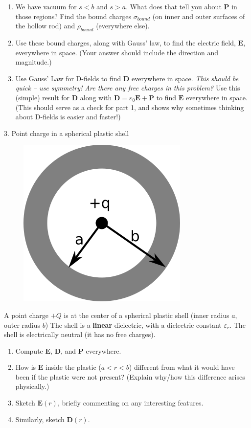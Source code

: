 \documentclass[11pt]{article}
\def\tightlist{}
\begin{document}
\begin{enumerate}
\def\labelenumi{\arabic{enumi}.}
\tightlist
\item
  We have vacuum for \(s<b\) and \(s>a\). What does that tell you about
  \(\mathbf{P}\) in those regions? Find the bound charges
  \(\sigma_{bound}\) (on inner and outer surfaces of the hollow rod) and
  \(\rho_{bound}\) (everywhere else).
\item
  Use these bound charges, along with Gauss' law, to find the electric
  field, \(\mathbf{E}\), everywhere in space. (Your answer should
  include the direction and magnitude.)
\item
  Use Gauss' Law for D-fields to find \(\mathbf{D}\) everywhere in
  space. \emph{This should be quick -- use symmetry! Are there any free
  charges in this problem?} Use this (simple) result for \(\mathbf{D}\)
  along with \(\mathbf{D}=\varepsilon_0 \mathbf{E}+\mathbf{P}\) to find
  \(\mathbf{E}\) everywhere in space. (This should serve as a check for
  part 1, and shows why sometimes thinking about D-fields is easier and
  faster!)
\end{enumerate}

{\Large 3. Point charge in a spherical plastic
shell}\label{point-charge-in-a-spherical-plastic-shell}

\begin{figure}[htbp]
\centering
\includegraphics[width=0.3\linewidth]{./images/hw8/dielectric_shell.png}
\end{figure}

A point charge \(+Q\) is at the center of a spherical plastic shell
(inner radius \(a\), outer radius \(b\)) The shell is a \textbf{linear}
dielectric, with a dielectric constant \(\varepsilon_r\). The shell is
electrically neutral (it has no free charges).

\begin{enumerate}
\def\labelenumi{\arabic{enumi}.}
\tightlist
\item
  Compute \(\mathbf{E}\), \(\mathbf{D}\), and \(\mathbf{P}\)
  everywhere.\\
\item
  How is \(\mathbf{E}\) inside the plastic (\(a<r<b\)) different from
  what it would have been if the plastic were not present? (Explain
  why/how this difference arises physically.)
\item
  Sketch \(\mathbf{E}(r)\), briefly commenting on any interesting
  features.
\item
  Similarly, sketch \(\mathbf{D}(r)\).
\end{enumerate}
\end{document}
